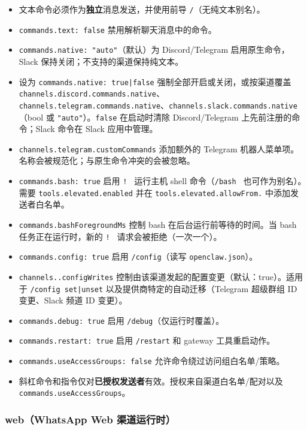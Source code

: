\begin{itemize}
  \item 文本命令必须作为\textbf{独立}消息发送，并使用前导 \texttt{/}（无纯文本别名）。
  \item \texttt{commands.text: false} 禁用解析聊天消息中的命令。
  \item \texttt{commands.native: "auto"}（默认）为 Discord/Telegram 启用原生命令，Slack 保持关闭；不支持的渠道保持纯文本。
  \item 设为 \texttt{commands.native: true|false} 强制全部开启或关闭，或按渠道覆盖 \texttt{channels.discord.commands.native}、\texttt{channels.telegram.commands.native}、\texttt{channels.slack.commands.native}（bool 或 \texttt{"auto"}）。\texttt{false} 在启动时清除 Discord/Telegram 上先前注册的命令；Slack 命令在 Slack 应用中管理。
  \item \texttt{channels.telegram.customCommands} 添加额外的 Telegram 机器人菜单项。名称会被规范化；与原生命令冲突的会被忽略。
  \item \texttt{commands.bash: true} 启用 \texttt{! } 运行主机 shell 命令（\texttt{/bash } 也可作为别名）。需要 \texttt{tools.elevated.enabled} 并在 \texttt{tools.elevated.allowFrom.} 中添加发送者白名单。
  \item \texttt{commands.bashForegroundMs} 控制 bash 在后台运行前等待的时间。当 bash 任务正在运行时，新的 \texttt{! } 请求会被拒绝（一次一个）。
  \item \texttt{commands.config: true} 启用 \texttt{/config}（读写 \texttt{openclaw.json}）。
  \item \texttt{channels..configWrites} 控制由该渠道发起的配置变更（默认：true）。适用于 \texttt{/config set|unset} 以及提供商特定的自动迁移（Telegram 超级群组 ID 变更、Slack 频道 ID 变更）。
  \item \texttt{commands.debug: true} 启用 \texttt{/debug}（仅运行时覆盖）。
  \item \texttt{commands.restart: true} 启用 \texttt{/restart} 和 gateway 工具重启动作。
  \item \texttt{commands.useAccessGroups: false} 允许命令绕过访问组白名单/策略。
  \item 斜杠命令和指令仅对\textbf{已授权发送者}有效。授权来自渠道白名单/配对以及 \texttt{commands.useAccessGroups}。
\end{itemize}


\subsubsection{web（WhatsApp Web 渠道运行时）}


